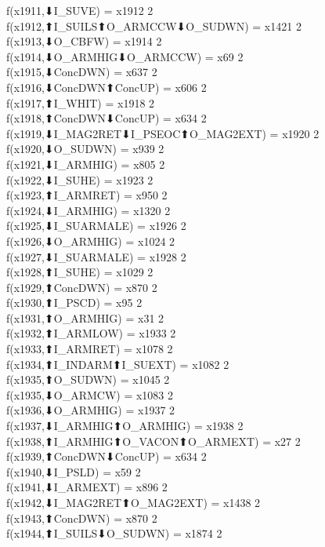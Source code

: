f(x1911,⬇I_SUVE) = x1912 {2} \\
f(x1912,⬆I_SUILS⬆O_ARMCCW⬇O_SUDWN) = x1421 {2} \\
f(x1913,⬇O_CBFW) = x1914 {2} \\
f(x1914,⬇O_ARMHIG⬇O_ARMCCW) = x69 {2} \\
f(x1915,⬇ConcDWN) = x637 {2} \\
f(x1916,⬇ConcDWN⬆ConcUP) = x606 {2} \\
f(x1917,⬆I_WHIT) = x1918 {2} \\
f(x1918,⬆ConcDWN⬇ConcUP) = x634 {2} \\
f(x1919,⬇I_MAG2RET⬇I_PSEOC⬆O_MAG2EXT) = x1920 {2} \\
f(x1920,⬇O_SUDWN) = x939 {2} \\
f(x1921,⬇I_ARMHIG) = x805 {2} \\
f(x1922,⬇I_SUHE) = x1923 {2} \\
f(x1923,⬆I_ARMRET) = x950 {2} \\
f(x1924,⬇I_ARMHIG) = x1320 {2} \\
f(x1925,⬇I_SUARMALE) = x1926 {2} \\
f(x1926,⬇O_ARMHIG) = x1024 {2} \\
f(x1927,⬇I_SUARMALE) = x1928 {2} \\
f(x1928,⬆I_SUHE) = x1029 {2} \\
f(x1929,⬆ConcDWN) = x870 {2} \\
f(x1930,⬆I_PSCD) = x95 {2} \\
f(x1931,⬆O_ARMHIG) = x31 {2} \\
f(x1932,⬆I_ARMLOW) = x1933 {2} \\
f(x1933,⬆I_ARMRET) = x1078 {2} \\
f(x1934,⬆I_INDARM⬆I_SUEXT) = x1082 {2} \\
f(x1935,⬆O_SUDWN) = x1045 {2} \\
f(x1935,⬇O_ARMCW) = x1083 {2} \\
f(x1936,⬇O_ARMHIG) = x1937 {2} \\
f(x1937,⬇I_ARMHIG⬆O_ARMHIG) = x1938 {2} \\
f(x1938,⬆I_ARMHIG⬆O_VACON⬆O_ARMEXT) = x27 {2} \\
f(x1939,⬆ConcDWN⬇ConcUP) = x634 {2} \\
f(x1940,⬇I_PSLD) = x59 {2} \\
f(x1941,⬇I_ARMEXT) = x896 {2} \\
f(x1942,⬇I_MAG2RET⬆O_MAG2EXT) = x1438 {2} \\
f(x1943,⬆ConcDWN) = x870 {2} \\
f(x1944,⬆I_SUILS⬇O_SUDWN) = x1874 {2} \\
